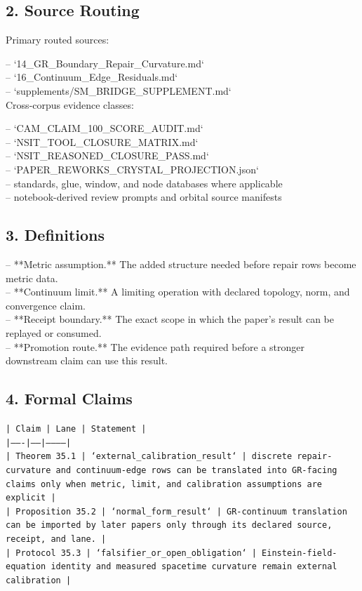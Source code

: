 \documentclass[11pt]{article}
\begin{document}
\subsection*{2. Source Routing}

Primary routed sources:

\noindent{}-- `14\_GR\_Boundary\_Repair\_Curvature.md`\\
\noindent{}-- `16\_Continuum\_Edge\_Residuals.md`\\
\noindent{}-- `supplements/SM\_BRIDGE\_SUPPLEMENT.md`\\

Cross-corpus evidence classes:

\noindent{}-- `CAM\_CLAIM\_100\_SCORE\_AUDIT.md`\\
\noindent{}-- `NSIT\_TOOL\_CLOSURE\_MATRIX.md`\\
\noindent{}-- `NSIT\_REASONED\_CLOSURE\_PASS.md`\\
\noindent{}-- `PAPER\_REWORKS\_CRYSTAL\_PROJECTION.json`\\
\noindent{}-- standards, glue, window, and node databases where applicable\\
\noindent{}-- notebook-derived review prompts and orbital source manifests\\

\subsection*{3. Definitions}

\noindent{}-- **Metric assumption.** The added structure needed before repair rows become metric data.\\
\noindent{}-- **Continuum limit.** A limiting operation with declared topology, norm, and convergence claim.\\
\noindent{}-- **Receipt boundary.** The exact scope in which the paper's result can be replayed or consumed.\\
\noindent{}-- **Promotion route.** The evidence path required before a stronger downstream claim can use this result.\\

\subsection*{4. Formal Claims}

\noindent\texttt{| Claim | Lane | Statement |}\\
\noindent\texttt{|-------|------|-----------|}\\
\noindent\texttt{| Theorem 35.1 | `external\_calibration\_result` | discrete repair-curvature and continuum-edge rows can be translated into GR-facing claims only when metric, limit, and calibration assumptions are explicit |}\\
\noindent\texttt{| Proposition 35.2 | `normal\_form\_result` | GR-continuum translation can be imported by later papers only through its declared source, receipt, and lane. |}\\
\noindent\texttt{| Protocol 35.3 | `falsifier\_or\_open\_obligation` | Einstein-field-equation identity and measured spacetime curvature remain external calibration |}\\
\end{document}
